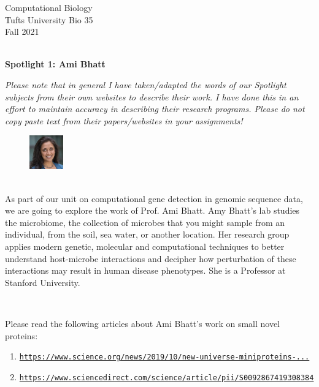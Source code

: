 \documentclass{article}
\begin{document}
\BeginAccSupp{}
\begin{flushright}
Computational Biology ~\\
Tufts University Bio 35 ~\\
Fall 2021 ~\\ ~\\
\end{flushright}
\begin{center}{\textbf{\Large{Spotlight 1: Ami Bhatt}}}\end{center}

\textit{Please note that in general I have taken/adapted the words of our Spotlight subjects from their own websites to describe their work. I have done this in an effort to maintain accuracy in describing their research programs. Please do not copy paste text from their papers/websites in your assignments!}

\begin{figure}
\begin{center}
 \includegraphics[width=0.13\textwidth]{images/ami-bhatt.jpg}
 \end{center}
\end{figure}
~\\ As part of our unit on computational gene detection in genomic sequence data, we are going to explore the work of Prof. Ami Bhatt. Amy Bhatt's lab studies the microbiome, the collection of microbes that you might sample from an individual, from the soil, sea water, or another location. Her research group applies modern genetic, molecular and computational techniques to better understand host-microbe interactions and decipher how perturbation of these interactions may result in human disease phenotypes. She is a Professor at Stanford University.

~\\
\vspace{-1em}

Please read the following articles about Ami Bhatt's work on small novel proteins: 
\begin{enumerate}
\item \texttt{\href{https://www.science.org/news/2019/10/new-universe-miniproteins-upending-cell-biology-and-genetics}{https://www.science.org/news/2019/10/new-universe-miniproteins-...}}
\item \texttt{\href{https://www.sciencedirect.com/science/article/pii/S0092867419308384}{https://www.sciencedirect.com/science/article/pii/S0092867419308384}}
\end{enumerate}
\end{document}
